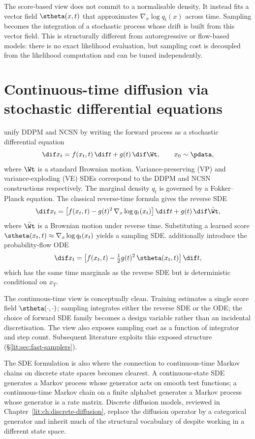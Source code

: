 The score-based view does not commit to a normalisable density. It instead
fits a vector field $\stheta(x,t)$ that approximates $\nabla_x\log q_t(x)$
across time. Sampling becomes the integration of a stochastic process whose
drift is built from this vector field. This is structurally different from
autoregressive or flow-based models: there is no exact likelihood evaluation,
but sampling cost is decoupled from the likelihood computation and can be
tuned independently.

\section{Continuous-time diffusion via stochastic differential equations}
\label{lit:sec:sde}

\textcite{song2021score} unify DDPM and NCSN by writing the forward process
as a stochastic differential equation
\[
  \dif x_t = f(x_t,t)\,\dif t + g(t)\,\dif \Wt,
  \qquad x_0 \sim \pdata,
\]
where $\Wt$ is a standard Brownian motion. Variance-preserving (VP) and
variance-exploding (VE) SDEs correspond to the DDPM and NCSN constructions
respectively. The marginal density $q_t$ is governed by a Fokker--Planck
equation. The classical reverse-time formula \parencite{anderson1982reverse}
gives the reverse SDE
\[
  \dif x_t = \big[f(x_t,t) - g(t)^2\,\nabla_x\log q_t(x_t)\big]\,\dif t
              + g(t)\,\dif \bar \Wt,
\]
where $\bar\Wt$ is a Brownian motion under reverse time. Substituting a
learned score $\stheta(x_t,t)\approx\nabla_x\log q_t(x_t)$ yields a sampling
SDE. \textcite{song2021score} additionally introduce the probability-flow ODE
\[
  \dif x_t = \big[f(x_t,t) - \tfrac{1}{2}g(t)^2\,\stheta(x_t,t)\big]\,\dif t,
\]
which has the same time marginals as the reverse SDE but is deterministic
conditional on $x_T$.

The continuous-time view is conceptually clean. Training estimates a single
score field $\stheta(\cdot,\cdot)$; sampling integrates either the reverse
SDE or the ODE; the choice of forward SDE family becomes a design variable
rather than an incidental discretisation. The view also exposes sampling
cost as a function of integrator and step count. Subsequent literature
exploits this exposed structure (\S\ref{lit:sec:fast-samplers}).

The SDE formulation is also where the connection to continuous-time Markov
chains on discrete state spaces becomes clearest. A continuous-state SDE
generates a Markov process whose generator acts on smooth test functions; a
continuous-time Markov chain on a finite alphabet generates a Markov process
whose generator is a rate matrix. Discrete diffusion models, reviewed in
Chapter~\ref{lit:ch:discrete-diffusion}, replace the diffusion operator by a
categorical generator and inherit much of the structural vocabulary of
\textcite{song2021score} despite working in a different state space.

